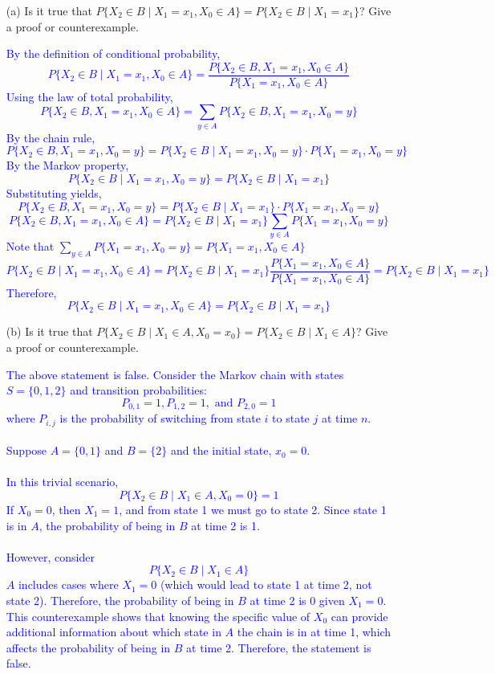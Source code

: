 \documentclass{article}
\begin{document}
\begin{enumerate}
    \item[(a)] Is it true that $P\{X_2 \in B \mid X_1 = x_1, X_0 \in A\} = P\{X_2 \in B \mid X_1 = x_1\}$? Give a proof or counterexample.

    \textcolor{blue}{By the definition of conditional probability,
$$P\{X_2 \in B \mid X_1 = x_1, X_0 \in A\} = \frac{P\{X_2 \in B, X_1 = x_1, X_0 \in A\}}{P\{X_1 = x_1, X_0 \in A\}}$$
Using the law of total probability,
$$P\{X_2 \in B, X_1 = x_1, X_0 \in A\} = \sum_{y \in A} P\{X_2 \in B, X_1 = x_1, X_0 = y\}$$
By the chain rule,
$$P\{X_2 \in B, X_1 = x_1, X_0 = y\} = P\{X_2 \in B \mid X_1 = x_1, X_0 = y\} \cdot P\{X_1 = x_1, X_0 = y\}$$
By the Markov property,
$$P\{X_2 \in B \mid X_1 = x_1, X_0 = y\} = P\{X_2 \in B \mid X_1 = x_1\}$$
Substituting yields,
$$P\{X_2 \in B, X_1 = x_1, X_0 = y\} = P\{X_2 \in B \mid X_1 = x_1\} \cdot P\{X_1 = x_1, X_0 = y\}$$
$$P\{X_2 \in B, X_1 = x_1, X_0 \in A\} = P\{X_2 \in B \mid X_1 = x_1\} \sum_{y \in A} P\{X_1 = x_1, X_0 = y\}$$
Note that $\sum_{y \in A} P\{X_1 = x_1, X_0 = y\} = P\{X_1 = x_1, X_0 \in A\}$ \\
$$P\{X_2 \in B \mid X_1 = x_1, X_0 \in A\} = P\{X_2 \in B \mid X_1 = x_1\} \frac{P\{X_1 = x_1, X_0 \in A\}}{P\{X_1 = x_1, X_0 \in A\}} = P\{X_2 \in B \mid X_1 = x_1\}$$
Therefore, $$P\{X_2 \in B \mid X_1 = x_1, X_0 \in A\} = P\{X_2 \in B \mid X_1 = x_1\}$$}


    \item[(b)] Is it true that $P\{X_2 \in B \mid X_1 \in A, X_0 = x_0\} = P\{X_2 \in B \mid X_1 \in A\}$? Give a proof or counterexample.


    \textcolor{blue}{The above statement is false. Consider the Markov chain
    with states $S = \{0, 1, 2\}$ and transition probabilities: $$P_{0,1}=1,
    P_{1,2}=1, \text{ and } P_{2,0}=1$$where $P_{i,j}$ is the probability of switching
from state $i$ to state $j$ at time $n$. \\ \\ Suppose $A=\{0,1\}$ and $B=\{2\}$ and the initial state, $x_0=0$. \\ \\
In this trivial scenario,
$$P\{X_2 \in B \mid X_1 \in A, X_0 = 0\} = 1$$
If $X_0 = 0$, then $X_1 = 1$, and from state 1 we must go to state 2. Since state 1 is in $A$, the probability of being in $B$ at time 2 is 1. \\
\\However, consider
$$P\{X_2 \in B \mid X_1 \in A\}$$$A$ includes cases where $X_1 = 0$ (which would lead to state 1 at time 2, not state 2).
Therefore, the probability of being in $B$ at time 2 is 0 given $X_1 = 0$. \\
This counterexample shows that knowing the specific value of $X_0$ can provide additional information about which state in $A$ the chain is in at time 1, which affects the probability of being in $B$ at time 2.
Therefore, the statement is false.}

\end{enumerate}
\end{document}
